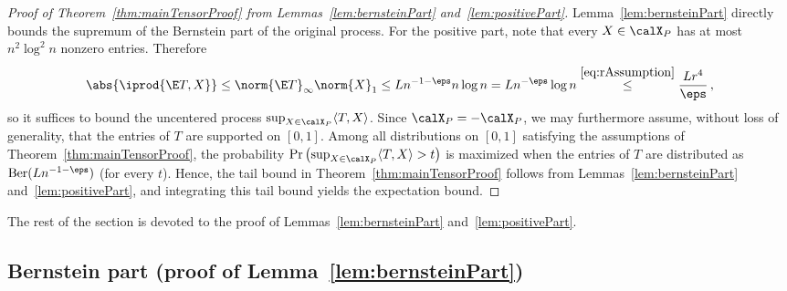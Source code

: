 \documentclass[11pt,a4paper]{article}
\begin{document}
\begin{proof}[Proof of Theorem~\ref{thm:mainTensorProof} from Lemmas~\ref{lem:bernsteinPart} and~\ref{lem:positivePart}]
    Lemma~\ref{lem:bernsteinPart} 
    directly bounds
    the supremum of the Bernstein part
    of the original process.
    For the positive part, note that every $X\in \calX_P$ has at most $n^2 \log^2 n$ nonzero entries. Therefore 
    \[
        \abs{\iprod{\E T, X}}\le \norm{\E T}_\infty \norm{X}_1\le Ln^{-1-\eps} n \log n = L  n^{-\eps} \log n\overset{\eqref{eq:rAssumption}} \le \frac {Lr^4} \eps\,,
    \]
    so it suffices to bound the uncentered process
    $\sup_{X\in \calX_P} \langle T, X\rangle$. Since $\calX_P = -\calX_P$, we may furthermore assume, without loss of generality, that the entries of $T$ are supported on
    $[0,1]$.
    Among all distributions on $[0,1]$ satisfying
    the assumptions of Theorem~\ref{thm:mainTensorProof},
    the probability $\Pr\left(\sup_{X\in \calX_P} \langle T, X\rangle>t\right)$ is maximized when the entries of $T$ are distributed as $\textnormal{Ber}(Ln^{-1-\eps})$ (for every $t$).
    Hence, the tail bound in Theorem~\ref{thm:mainTensorProof}
    follows from Lemmas~\ref{lem:bernsteinPart}
    and~\ref{lem:positivePart}, and integrating this tail bound yields the expectation bound.
\end{proof}

The rest of the section
is devoted to the proof of
Lemmas~\ref{lem:bernsteinPart}
and~\ref{lem:positivePart}.


\subsection{Bernstein part \texorpdfstring{(proof of Lemma~\ref{lem:bernsteinPart})}{}}
\end{document}
